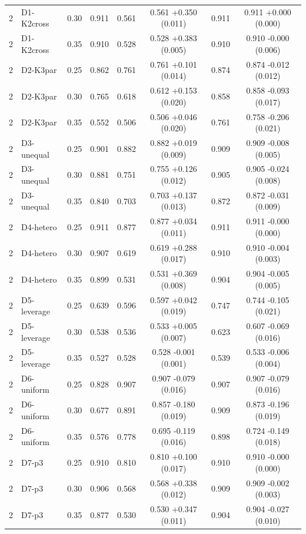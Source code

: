 {\begin{longtable}{llcccccc}
2 & D1-K2cross & 0.30 & 0.911 & 0.561 & 0.561 +0.350 (0.011) & 0.911 & 0.911 +0.000 (0.000) \\
2 & D1-K2cross & 0.35 & 0.910 & 0.528 & 0.528 +0.383 (0.005) & 0.910 & 0.910 -0.000 (0.006) \\
2 & D2-K3par & 0.25 & 0.862 & 0.761 & 0.761 +0.101 (0.014) & 0.874 & 0.874 -0.012 (0.012) \\
2 & D2-K3par & 0.30 & 0.765 & 0.618 & 0.612 +0.153 (0.020) & 0.858 & 0.858 -0.093 (0.017) \\
2 & D2-K3par & 0.35 & 0.552 & 0.506 & 0.506 +0.046 (0.020) & 0.761 & 0.758 -0.206 (0.021) \\
2 & D3-unequal & 0.25 & 0.901 & 0.882 & 0.882 +0.019 (0.009) & 0.909 & 0.909 -0.008 (0.005) \\
2 & D3-unequal & 0.30 & 0.881 & 0.751 & 0.755 +0.126 (0.012) & 0.905 & 0.905 -0.024 (0.008) \\
2 & D3-unequal & 0.35 & 0.840 & 0.703 & 0.703 +0.137 (0.013) & 0.872 & 0.872 -0.031 (0.009) \\
2 & D4-hetero & 0.25 & 0.911 & 0.877 & 0.877 +0.034 (0.011) & 0.911 & 0.911 -0.000 (0.000) \\
2 & D4-hetero & 0.30 & 0.907 & 0.619 & 0.619 +0.288 (0.017) & 0.910 & 0.910 -0.004 (0.003) \\
2 & D4-hetero & 0.35 & 0.899 & 0.531 & 0.531 +0.369 (0.008) & 0.904 & 0.904 -0.005 (0.005) \\
2 & D5-leverage & 0.25 & 0.639 & 0.596 & 0.597 +0.042 (0.019) & 0.747 & 0.744 -0.105 (0.021) \\
2 & D5-leverage & 0.30 & 0.538 & 0.536 & 0.533 +0.005 (0.007) & 0.623 & 0.607 -0.069 (0.016) \\
2 & D5-leverage & 0.35 & 0.527 & 0.528 & 0.528 -0.001 (0.001) & 0.539 & 0.533 -0.006 (0.004) \\
2 & D6-uniform & 0.25 & 0.828 & 0.907 & 0.907 -0.079 (0.016) & 0.907 & 0.907 -0.079 (0.016) \\
2 & D6-uniform & 0.30 & 0.677 & 0.891 & 0.857 -0.180 (0.019) & 0.909 & 0.873 -0.196 (0.019) \\
2 & D6-uniform & 0.35 & 0.576 & 0.778 & 0.695 -0.119 (0.016) & 0.898 & 0.724 -0.149 (0.018) \\
2 & D7-p3 & 0.25 & 0.910 & 0.810 & 0.810 +0.100 (0.017) & 0.910 & 0.910 -0.000 (0.000) \\
2 & D7-p3 & 0.30 & 0.906 & 0.568 & 0.568 +0.338 (0.012) & 0.909 & 0.909 -0.002 (0.003) \\
2 & D7-p3 & 0.35 & 0.877 & 0.530 & 0.530 +0.347 (0.011) & 0.904 & 0.904 -0.027 (0.010) \\

\end{longtable}}
